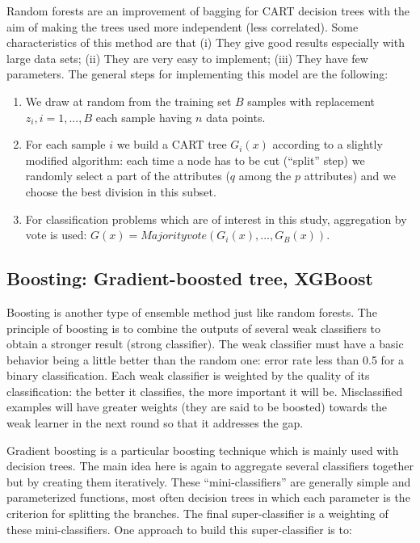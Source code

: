 \documentclass[LaM,binding=0.6cm, english]{sapthesis}
\begin{document}
\par Random forests are an improvement of bagging for CART decision trees with the aim of making the trees used more independent (less correlated). Some characteristics of this method are that (i) They give good results especially  with large data sets; (ii) They are very easy to implement; (iii) They have few parameters.\cite{Fang2016} The general steps for implementing this model are the following:

\begin{enumerate}
	\item We draw at random from the training set \(B\) samples with replacement \(z_i, i = 1, ..., B\) each sample having \(n\) data points.
  	\item For each sample \(i\) we build a CART tree \(G_i(x)\) according to a slightly modified algorithm: each time a node has to be cut (“split” step) we randomly select a part of the attributes (\(q\) among the \(p\) attributes) and we choose the best division in this subset.
  	\item For classification problems which are of interest in this study, aggregation by vote is used: \(G(x) = Majority vote(G_i(x), ..., G_B(x))\).
\end{enumerate}

\subsection{Boosting: Gradient-boosted tree, XGBoost}

Boosting is another type of ensemble method just like random forests. The principle of boosting is to combine the outputs of several weak classifiers to obtain a stronger result (strong classifier). The weak classifier must have a basic behavior being a little better than the random one: error rate less than 0.5 for a binary classification. Each weak classifier is weighted by the quality of its classification: the better it classifies, the more important it will be. Misclassified examples will have greater weights (they are said to be boosted) towards the weak learner in the next round so that it addresses the gap.\cite{Freund}

\par Gradient boosting is a particular boosting technique which is  mainly used with decision trees. The main idea here is again to aggregate several classifiers together but by creating them iteratively. These “mini-classifiers” are generally simple and parameterized functions, most often decision trees in which each parameter is the criterion for splitting the branches. The final super-classifier is a weighting of these mini-classifiers. One approach to build this super-classifier is to:
\end{document}
